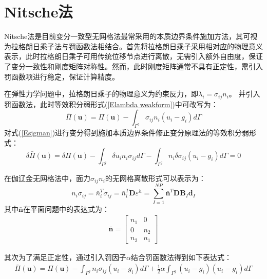 \section{Nitsche法}
Nitsche法\cite{}是目前变分一致型无网格法最常采用的本质边界条件施加方法，其可视为拉格朗日乘子法与罚函数法相结合。首先将拉格朗日乘子采用相对应的物理意义表示，此时拉格朗日乘子可用传统位移节点进行离散，无需引入额外自由度，保证了变分一致性和刚度矩阵对称性。然而，此时刚度矩阵通常不具有正定性，需引入罚函数项进行稳定，保证计算精度。\par
在弹性力学问题中，拉格朗日乘子的物理意义为约束反力，即$\lambda_i=\sigma_{ij}n_i$。
并引入罚函数法，此时等效积分弱形式(\ref{Elambda weakform})中可改写为：
\begin{equation}\label{Esigman}
    \bar{\Pi}(\pmb{u})=\Pi(\pmb{u})-\int_{\Gamma^g}\sigma_{ij}n_i(u_i-g_i)d\Gamma
\end{equation}
对式(\ref{Esigman})进行变分得到施加本质边界条件修正变分原理法的等效积分弱形式：
\begin{equation}\label{Esigman weakform}
    \delta\bar{\Pi}(\pmb{u})=\delta\Pi(\pmb{u})-\int_{\Gamma^g}\delta u_in_i\sigma_{ij}d\Gamma-\int_{\Gamma^g}n_i\delta\sigma_{ij}(u_i-g_i)d\Gamma
    =0
\end{equation}\par
在伽辽金无网格法中，面力$\sigma_{ij}n_i$的无网格离散形式可以表示为：
\begin{equation}\label{Esigman wuwanggelisan}
    n_i\sigma_{ij}=\bar{n}_i^T\sigma_{ij}=\bar{n}_i^T\pmb{D}\varepsilon^h=\sum_{I=1}^{N\!P}\bar{\pmb n}^T\pmb D\pmb{B}_I\pmb{d}_I
\end{equation}
其中$\bar{\pmb{n}}$在平面问题中的表达式为：
\begin{equation}
\begin{split}
    \bar{\pmb n}=\left[\begin{matrix}n_1&0\\0&n_2\\n_2&n_1
    \end{matrix}\right]
\end{split}
\end{equation}\par
其次为了满足正定性，通过引入罚因子$\alpha$结合罚函数法得到如下表达式：
\begin{equation}\label{Enitsche}
\begin{split}
    \bar{\Pi}(\pmb{u})=\Pi(\pmb{u})-\int_{\Gamma^g}n_i\sigma_{ij}(u_i-g_i)d\Gamma+\frac{1}{2}\alpha\int_{\Gamma^g}(u_i-g_i)(u_i-g_i)d\Gamma
\end{split}
\end{equation}

